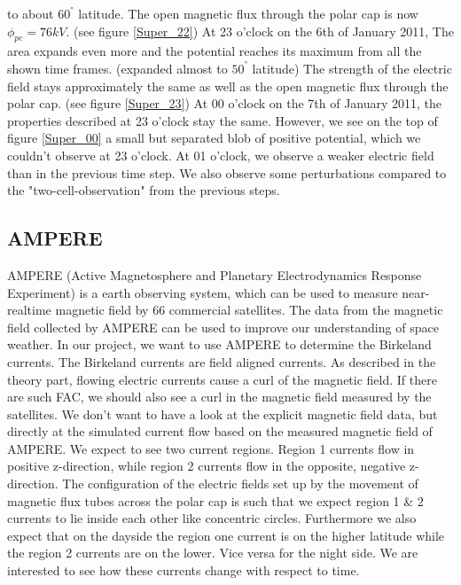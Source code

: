 \documentclass[10pt,a4paper]{article}
\begin{document}
to about $60^{°}$ latitude. The open magnetic flux through the polar cap is now $\phi_{pc}=76 k V$. (see figure \ref{Super_22})
At 23 o'clock on the 6th of January 2011, The area expands even more and the potential reaches its maximum from all the shown time frames. (expanded almost to $50^{°}$ 
latitude) The strength of the electric field stays approximately the same as well as the open magnetic flux through the polar cap. (see figure \ref{Super_23})
At 00 o'clock on the 7th of January 2011, the properties described at 23 o'clock stay the same. However, we see on the top of figure \ref{Super_00} a small but 
separated blob of positive potential, which we couldn't observe at 23 o'clock.
At 01 o'clock, we observe a weaker electric field than in the previous time step. We also observe some perturbations compared to the  "two-cell-observation" from the 
previous steps. 


\subsection{AMPERE \label{0_CHAPTER_AMPERE}}
AMPERE (Active Magnetosphere and Planetary Electrodynamics Response Experiment) is a earth observing system, which can be used to measure near-realtime magnetic 
field by 66 commercial satellites. The data from the magnetic field collected by AMPERE can be used to improve our understanding of space weather. In our project, 
we want to use AMPERE to determine the Birkeland currents. The Birkeland currents are field aligned currents. As described in the theory part, flowing electric currents 
cause a curl of the magnetic field. If there are such FAC, we should also see a curl in the magnetic field measured by the satellites.
We don't want to have a look at the explicit magnetic field data, but directly at the simulated current flow based on the measured magnetic field of AMPERE. We expect to 
see two current regions. Region 1 currents flow in positive z-direction, while region 2 currents flow in the opposite, negative z-direction. The configuration 
of the electric fields set up by the movement of magnetic flux tubes across the polar cap is such that we expect region 1 \& 2 currents to lie inside each other like concentric circles. Furthermore we also expect that on the dayside the region one current is on the higher latitude while the region 2 currents are on the lower. Vice versa for the night side. We are interested to see how these currents change with respect to time.  
\end{document}
